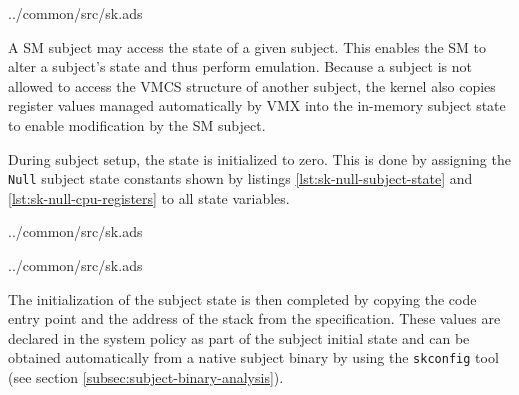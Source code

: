
	{../common/src/sk.ads}

A SM subject may access the state of a given subject. This enables
the SM to alter a subject's state and thus perform emulation. Because a subject
is not allowed to access the VMCS structure of another subject, the kernel also
copies register values managed automatically by VMX into the
in-memory subject state to enable modification by the SM subject.

During subject setup, the state is initialized to zero. This is done by
assigning the \texttt{Null} subject state constants shown by listings
\ref{lst:sk-null-subject-state} and \ref{lst:sk-null-cpu-registers} to all
state variables.


	{../common/src/sk.ads}


	{../common/src/sk.ads}

The initialization of the subject state is then completed by copying the code
entry point and the address of the stack from the specification.  These values
are declared in the system policy as part of the subject initial state and can
be obtained automatically from a native subject binary by using the
\texttt{skconfig} tool (see section \ref{subsec:subject-binary-analysis}).
